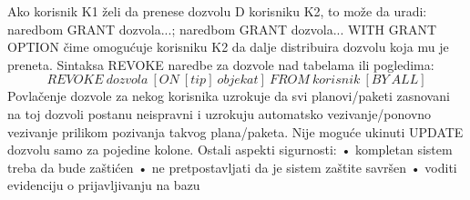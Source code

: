 \documentclass{article}
\begin{document}
\newline
Ako korisnik K1 želi da prenese dozvolu D korisniku K2, to može
da uradi: naredbom GRANT dozvola...; naredbom GRANT dozvola...
WITH GRANT OPTION čime omogućuje korisniku K2 da dalje
distribuira dozvolu koja mu je preneta.
\vspace{0.2cm} \newline
Sintaksa REVOKE naredbe za dozvole nad tabelama ili pogledima:
$$REVOKE\ dozvola\ [ON\ [tip]\ objekat]\ FROM\ korisnik\ [BY\ 
ALL]$$
Povlačenje dozvole za nekog korisnika uzrokuje da svi
planovi/paketi zasnovani na toj dozvoli postanu neispravni i
uzrokuju automatsko vezivanje/ponovno vezivanje prilikom
pozivanja takvog plana/paketa. Nije moguće ukinuti UPDATE
dozvolu samo za pojedine kolone.
\vspace{0.2cm} \newline
Ostali aspekti sigurnosti:
\newline \hspace*{0.4cm} • kompletan sistem treba da bude
zaštićen
\newline \hspace*{0.4cm} • ne pretpostavljati da je sistem
zaštite savršen
\newline \hspace*{0.4cm} • voditi evidenciju o prijavljivanju na
bazu
\end{document}
